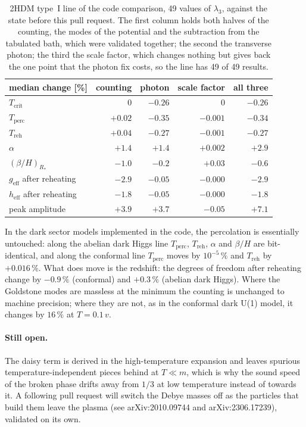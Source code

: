 \documentclass[11pt,a4paper]{article}
\renewcommand{\_}{\oldunderscore\allowbreak}
\begin{document}
\begin{table}[h]
\centering
\begin{tabular}{lrrrr}
\toprule
median change [\%] & counting & photon & scale factor & all three \\
\midrule
$T_\text{crit}$                & $0$     & $-0.26$  & $0$      & $-0.26$ \\
$T_\text{perc}$                & $+0.02$ & $-0.35$  & $-0.001$ & $-0.34$ \\
$T_\text{reh}$                 & $+0.04$ & $-0.27$  & $-0.001$ & $-0.27$ \\
$\alpha$                       & $+1.4$  & $+1.4$   & $+0.002$ & $+2.9$ \\
$(\beta/H)_{R_*}$              & $-1.0$  & $-0.2$   & $+0.03$  & $-0.6$ \\
$g_\text{eff}$ after reheating & $-2.9$  & $-0.05$  & $-0.000$ & $-2.9$ \\
$h_\text{eff}$ after reheating & $-1.8$  & $-0.05$  & $-0.000$ & $-1.8$ \\
peak amplitude                 & $+3.9$  & $+3.7$   & $-0.05$  & $+7.1$ \\
\bottomrule
\end{tabular}
\caption{2HDM type~I line of the code comparison, 49 values of $\lambda_3$, against the state
before this pull request. The first column holds both halves of the counting, the modes of the
potential and the subtraction from the tabulated bath, which were validated together; the
second the transverse photon; the third the scale factor, which changes nothing but gives back
the one point that the photon fix costs, so the line has 49 of 49 results.}
\end{table}

In the dark sector models implemented in the code, the percolation is essentially untouched:
along the abelian dark Higgs line $T_\text{perc}$, $T_\text{reh}$, $\alpha$ and $\beta/H$ are
bit-identical, and along the conformal line $T_\text{perc}$ moves by $10^{-5}\,\%$ and
$T_\text{reh}$ by $+0.016\,\%$. What does move is the redshift: the degrees of freedom after
reheating change by $-0.9\,\%$ (conformal) and $+0.3\,\%$ (abelian dark Higgs). Where the Goldstone modes are massless at the minimum the counting is unchanged to
machine precision; where they are not, as in the conformal dark U(1) model, it changes by
$16\,\%$ at $T = 0.1\,v$.

\paragraph{Still open.} The daisy term is derived in the high-temperature expansion and leaves
spurious temperature-independent pieces behind at $T \ll m$, which is why the sound speed
of the broken phase drifts away from $1/3$ at low temperature instead of towards it. A
following pull request will switch the Debye masses off as the particles that build them leave
the plasma (see arXiv:2010.09744 and arXiv:2306.17239), validated on its own.
\end{document}
